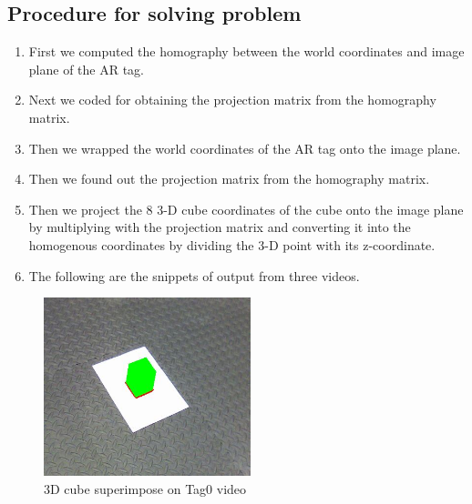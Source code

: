\documentclass[12pt]{article}
\begin{document}
\subsection{Procedure for solving problem }
\begin{enumerate}
\item First we computed the homography between the world coordinates and image plane of the AR tag.

\item Next we coded for obtaining the projection matrix from the homography matrix.

\item Then we wrapped the world coordinates of the AR tag onto the image plane. 

\item Then we found out the projection matrix from the homography matrix.

\item Then we project the 8 3-D cube coordinates of the cube onto the image plane by multiplying with the projection matrix and converting it into the homogenous coordinates by dividing the 3-D point with its z-coordinate.

\item The following are the snippets of output from three videos.
\end{enumerate}
\begin{figure}[h]
    \centering
    \includegraphics[width=6cm]{Tag0_cube}
    \caption{3D cube superimpose on Tag0 video}
    \label{fig:video frame output}
\end{figure}
\newpage
\end{document}

